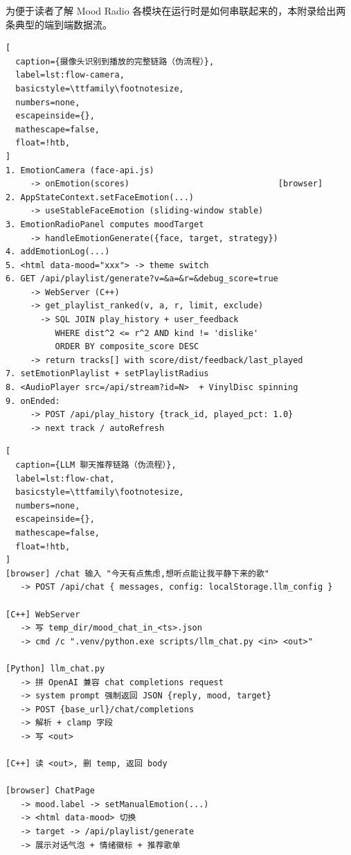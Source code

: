 \label{sec:appendix-flow}

为便于读者了解 Mood Radio 各模块在运行时是如何串联起来的，本附录给出两条典型的端到端数据流。


\begin{lstlisting}[
  caption={摄像头识别到播放的完整链路（伪流程）},
  label=lst:flow-camera,
  basicstyle=\ttfamily\footnotesize,
  numbers=none,
  escapeinside={},
  mathescape=false,
  float=!htb,
]
1. EmotionCamera (face-api.js)
     -> onEmotion(scores)                              [browser]
2. AppStateContext.setFaceEmotion(...)
     -> useStableFaceEmotion (sliding-window stable)
3. EmotionRadioPanel computes moodTarget
     -> handleEmotionGenerate({face, target, strategy})
4. addEmotionLog(...)
5. <html data-mood="xxx"> -> theme switch
6. GET /api/playlist/generate?v=&a=&r=&debug_score=true
     -> WebServer (C++)
     -> get_playlist_ranked(v, a, r, limit, exclude)
       -> SQL JOIN play_history + user_feedback
          WHERE dist^2 <= r^2 AND kind != 'dislike'
          ORDER BY composite_score DESC
     -> return tracks[] with score/dist/feedback/last_played
7. setEmotionPlaylist + setPlaylistRadius
8. <AudioPlayer src=/api/stream?id=N>  + VinylDisc spinning
9. onEnded:
     -> POST /api/play_history {track_id, played_pct: 1.0}
     -> next track / autoRefresh
\end{lstlisting}


\begin{lstlisting}[
  caption={LLM 聊天推荐链路（伪流程）},
  label=lst:flow-chat,
  basicstyle=\ttfamily\footnotesize,
  numbers=none,
  escapeinside={},
  mathescape=false,
  float=!htb,
]
[browser] /chat 输入 "今天有点焦虑,想听点能让我平静下来的歌"
   -> POST /api/chat { messages, config: localStorage.llm_config }

[C++] WebServer
   -> 写 temp_dir/mood_chat_in_<ts>.json
   -> cmd /c ".venv/python.exe scripts/llm_chat.py <in> <out>"

[Python] llm_chat.py
   -> 拼 OpenAI 兼容 chat completions request
   -> system prompt 强制返回 JSON {reply, mood, target}
   -> POST {base_url}/chat/completions
   -> 解析 + clamp 字段
   -> 写 <out>

[C++] 读 <out>, 删 temp, 返回 body

[browser] ChatPage
   -> mood.label -> setManualEmotion(...)
   -> <html data-mood> 切换
   -> target -> /api/playlist/generate
   -> 展示对话气泡 + 情绪徽标 + 推荐歌单
\end{lstlisting}

